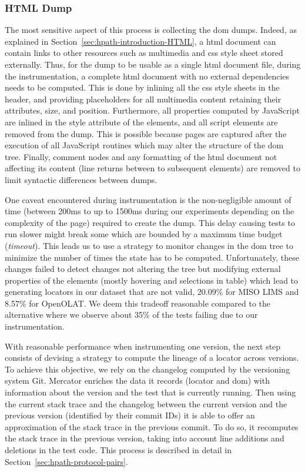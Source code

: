 \subsubsection{HTML Dump}
\label{sec:hpath-protocol-capture}

The most sensitive aspect of this process is collecting the \gls{dom} dumps. Indeed, as explained in Section~\ref{sec:hpath-introduction-HTML}, a \gls{html} document can contain links to other resources such as multimedia and \gls{css} style sheet stored externally. Thus, for the dump to be usable as a single \gls{html} document file, during the instrumentation, a complete \gls{html} document with no external dependencies needs to be computed. This is done by inlining all the \gls{css} style sheets in the header, and providing placeholders for all multimedia content retaining their attributes, size, and position. Furthermore, all properties computed by JavaScript are inlined in the style attribute of the elements, and all script elements are removed from the dump. This is possible because pages are captured after the execution of all JavaScript routines which may alter the structure of the \gls{dom} tree. Finally, comment nodes and any formatting of the \gls{html} document not affecting its content (line returns between to subsequent elements) are removed to limit syntactic differences between dumps.

One caveat encountered during instrumentation is the non-negligible amount of time (between 200ms to up to 1500ms during our experiments depending on the complexity of the page) required to create the dump. This delay causing tests to run slower might break some which are bounded by a maximum time budget (\emph{timeout}). This leads us to use a strategy to monitor changes in the \gls{dom} tree to minimize the number of times the state has to be computed. Unfortunately, these changes failed to detect changes not altering the tree but modifying external properties of the elements (mostly hovering and selections in table) which lead to generating locators in our dataset that are not valid, 20.09\% for MISO LIMS and 8.57\% for OpenOLAT. We deem this tradeoff reasonable compared to the alternative where we observe about 35\% of the tests failing due to our instrumentation.

With reasonable performance when instrumenting one version, the next step consists of devising a strategy to compute the lineage of a locator across versions. To achieve this objective, we rely on the changelog computed by the versioning system Git. Mercator enriches the data it records (locator and \gls{dom}) with information about the version and the test that is currently running. Then using the current stack trace and the changelog between the current version and the previous version (identified by their commit IDs) it is able to offer an approximation of the stack trace in the previous commit. To do so, it recomputes the stack trace in the previous version, taking into account line additions and deletions in the test code. This process is described in detail in Section~\ref{sec:hpath-protocol-pairs}.

